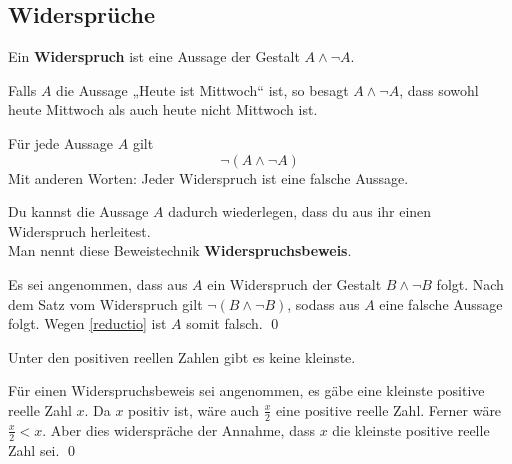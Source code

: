\subsection{Widersprüche}



\begin{de}
 Ein \textbf{Widerspruch} ist eine Aussage der Gestalt $A\land \neg A$.
\end{de}


\begin{bsp}
 Falls $A$ die Aussage „Heute ist Mittwoch“ ist, so besagt $A\land \neg A$, dass sowohl heute Mittwoch als auch heute nicht Mittwoch ist.
\end{bsp}




\begin{axi}
 Für jede Aussage $A$ gilt
 \[ \neg(A\land \neg A) \]
 Mit anderen Worten: Jeder Widerspruch ist eine falsche Aussage.
\end{axi}






  \begin{sat} \label{widerspruch}
Du kannst die Aussage $A$ dadurch wiederlegen, dass du aus ihr einen Widerspruch herleitest. \\
Man nennt diese Beweistechnik \textbf{Widerspruchsbeweis}.
  \end{sat}
\begin{bew}
 Es sei angenommen, dass aus $A$ ein Widerspruch der Gestalt $B\land \neg B$ folgt. Nach dem Satz vom Widerspruch gilt $\neg (B\land \neg B)$, sodass aus $A$ eine falsche Aussage folgt. Wegen \cref{reductio} ist $A$ somit falsch. \qed
\end{bew}

  
  
  
\begin{bsp}
Unter den positiven reellen Zahlen gibt es keine kleinste.
  \end{bsp}
  \begin{bew}
  Für einen Widerspruchsbeweis sei angenommen, es gäbe eine kleinste positive reelle Zahl $x$. Da $x$ positiv ist, wäre auch $\frac{x}{2}$ eine positive reelle Zahl. Ferner wäre $\frac{x}{2}<x$. Aber dies widerspräche der Annahme, dass $x$ die kleinste positive reelle Zahl sei. \qed
  \end{bew}
  
